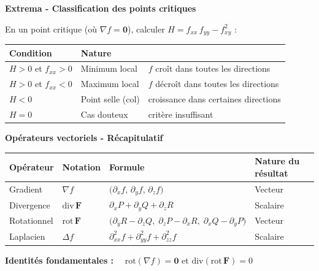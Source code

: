 \documentclass[11pt,a4paper]{article}
\begin{document}
\begin{methodebox}
\textbf{Extrema - Classification des points critiques}

En un point critique (où $\nabla f = \mathbf{0}$), calculer $H = f_{xx}\,f_{yy} - f_{xy}^2$ :
\begin{center}
\begin{tabular}{@{}lll@{}}
\toprule
Condition & Nature & \\
\midrule
$H > 0$ et $f_{xx} > 0$ & Minimum local    & $f$ croît dans toutes les directions \\
$H > 0$ et $f_{xx} < 0$ & Maximum local    & $f$ décroît dans toutes les directions \\
$H < 0$                 & Point selle (col) & croissance dans certaines directions \\
$H = 0$                 & Cas douteux      & critère insuffisant \\
\bottomrule
\end{tabular}
\end{center}
\end{methodebox}

\vspace{6pt}

\begin{methodebox}
\textbf{Opérateurs vectoriels - Récapitulatif}
\begin{center}
\begin{tabular}{@{}llll@{}}
\toprule
Opérateur & Notation & Formule & Nature du résultat \\
\midrule
Gradient   & $\nabla f$           & $\bigl(\partial_x f,\,\partial_y f,\,\partial_z f\bigr)$                                         & Vecteur \\[4pt]
Divergence & $\text{div}\,\mathbf{F}$ & $\partial_x P + \partial_y Q + \partial_z R$                                                  & Scalaire \\[4pt]
Rotationnel & $\text{rot}\,\mathbf{F}$ & $\bigl(\partial_y R - \partial_z Q,\;\partial_z P - \partial_x R,\;\partial_x Q - \partial_y P\bigr)$ & Vecteur \\[4pt]
Laplacien  & $\Delta f$           & $\partial^2_{xx} f + \partial^2_{yy} f + \partial^2_{zz} f$                                    & Scalaire \\
\bottomrule
\end{tabular}
\end{center}

\textbf{Identités fondamentales :} $\quad\text{rot}(\nabla f) = \mathbf{0}$ \quad et \quad $\text{div}(\text{rot}\,\mathbf{F}) = 0$
\end{methodebox}
\end{document}
